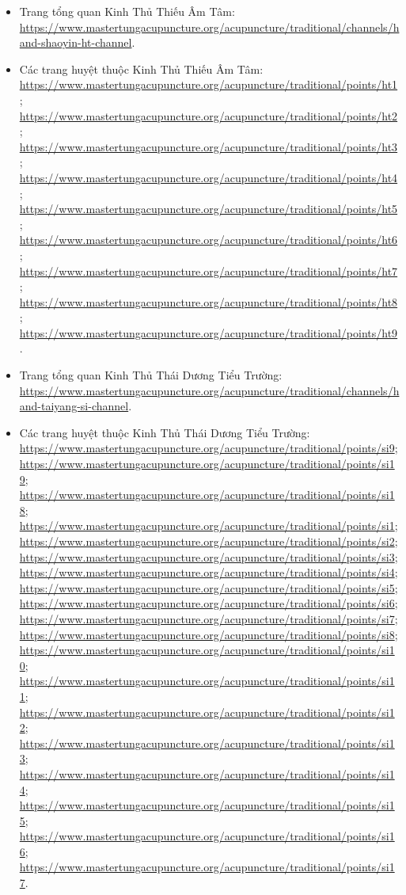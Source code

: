 \documentclass[12pt,a4paper]{article}
\begin{document}
\begin{itemize}
  \item Trang tổng quan Kinh Thủ Thiếu Âm Tâm: \url{https://www.mastertungacupuncture.org/acupuncture/traditional/channels/hand-shaoyin-ht-channel}.
  \item Các trang huyệt thuộc Kinh Thủ Thiếu Âm Tâm: \url{https://www.mastertungacupuncture.org/acupuncture/traditional/points/ht1}; \url{https://www.mastertungacupuncture.org/acupuncture/traditional/points/ht2}; \url{https://www.mastertungacupuncture.org/acupuncture/traditional/points/ht3}; \url{https://www.mastertungacupuncture.org/acupuncture/traditional/points/ht4}; \url{https://www.mastertungacupuncture.org/acupuncture/traditional/points/ht5}; \url{https://www.mastertungacupuncture.org/acupuncture/traditional/points/ht6}; \url{https://www.mastertungacupuncture.org/acupuncture/traditional/points/ht7}; \url{https://www.mastertungacupuncture.org/acupuncture/traditional/points/ht8}; \url{https://www.mastertungacupuncture.org/acupuncture/traditional/points/ht9}.
  \item Trang tổng quan Kinh Thủ Thái Dương Tiểu Trường: \url{https://www.mastertungacupuncture.org/acupuncture/traditional/channels/hand-taiyang-si-channel}.
  \item Các trang huyệt thuộc Kinh Thủ Thái Dương Tiểu Trường: \url{https://www.mastertungacupuncture.org/acupuncture/traditional/points/si9}; \url{https://www.mastertungacupuncture.org/acupuncture/traditional/points/si19}; \url{https://www.mastertungacupuncture.org/acupuncture/traditional/points/si18}; \url{https://www.mastertungacupuncture.org/acupuncture/traditional/points/si1}; \url{https://www.mastertungacupuncture.org/acupuncture/traditional/points/si2}; \url{https://www.mastertungacupuncture.org/acupuncture/traditional/points/si3}; \url{https://www.mastertungacupuncture.org/acupuncture/traditional/points/si4}; \url{https://www.mastertungacupuncture.org/acupuncture/traditional/points/si5}; \url{https://www.mastertungacupuncture.org/acupuncture/traditional/points/si6}; \url{https://www.mastertungacupuncture.org/acupuncture/traditional/points/si7}; \url{https://www.mastertungacupuncture.org/acupuncture/traditional/points/si8}; \url{https://www.mastertungacupuncture.org/acupuncture/traditional/points/si10}; \url{https://www.mastertungacupuncture.org/acupuncture/traditional/points/si11}; \url{https://www.mastertungacupuncture.org/acupuncture/traditional/points/si12}; \url{https://www.mastertungacupuncture.org/acupuncture/traditional/points/si13}; \url{https://www.mastertungacupuncture.org/acupuncture/traditional/points/si14}; \url{https://www.mastertungacupuncture.org/acupuncture/traditional/points/si15}; \url{https://www.mastertungacupuncture.org/acupuncture/traditional/points/si16}; \url{https://www.mastertungacupuncture.org/acupuncture/traditional/points/si17}.

\end{itemize}
\end{document}
